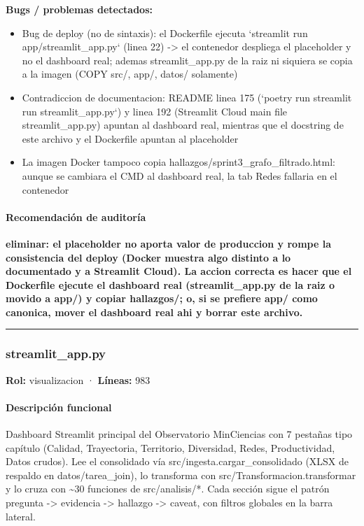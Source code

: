 \begin{tcolorbox}[riesgo]
\textbf{Bugs / problemas detectados:}
\begin{itemize}
  \item Bug de deploy (no de sintaxis): el Dockerfile ejecuta `streamlit run app/streamlit\_app.py` (linea 22) -> el contenedor despliega el placeholder y no el dashboard real; ademas streamlit\_app.py de la raiz ni siquiera se copia a la imagen (COPY src/, app/, datos/ solamente)
  \item Contradiccion de documentacion: README linea 175 (`poetry run streamlit run streamlit\_app.py`) y linea 192 (Streamlit Cloud main file streamlit\_app.py) apuntan al dashboard real, mientras que el docstring de este archivo y el Dockerfile apuntan al placeholder
  \item La imagen Docker tampoco copia hallazgos/sprint3\_grafo\_filtrado.html: aunque se cambiara el CMD al dashboard real, la tab Redes fallaria en el contenedor
\end{itemize}
\end{tcolorbox}

\paragraph{Recomendación de auditoría}
\textbf{eliminar: el placeholder no aporta valor de produccion y rompe la consistencia del deploy (Docker muestra algo distinto a lo documentado y a Streamlit Cloud). La accion correcta es hacer que el Dockerfile ejecute el dashboard real (streamlit\_app.py de la raiz o movido a app/) y copiar hallazgos/; o, si se prefiere app/ como canonica, mover el dashboard real ahi y borrar este archivo.}

\medskip
\hrule

\subsubsection{streamlit\_app.py}
\textbf{Rol:} visualizacion · \textbf{Líneas:} 983

\paragraph{Descripción funcional}
Dashboard Streamlit principal del Observatorio MinCiencias con 7 pestañas tipo capítulo (Calidad, Trayectoria, Territorio, Diversidad, Redes, Productividad, Datos crudos). Lee el consolidado vía src/ingesta.cargar\_consolidado (XLSX de respaldo en datos/tarea\_join), lo transforma con src/Transformacion.transformar y lo cruza con \textasciitilde{}30 funciones de src/analisis/*. Cada sección sigue el patrón pregunta -> evidencia -> hallazgo -> caveat, con filtros globales en la barra lateral.

